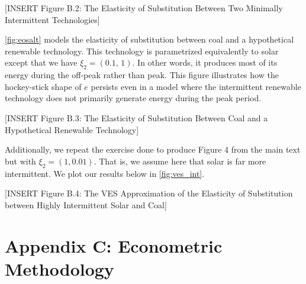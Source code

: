 \documentclass[11pt,a4paper,leqno]{extarticle}
\begin{document}
	
	
	\vspace{0.15in}
	\begin{center}
		[INSERT Figure B.2: The Elasticity of Substitution Between Two  Minimally Intermittent Technologies]
	\end{center}
	\vspace{0.15in}
	
	\autoref{fig:eosalt} models the elasticity of substitution between coal and a hypothetical renewable technology. This technology is parametrized equivalently to solar except that we have $\xi_2 = (0.1, \, 1)$. In other words, it produces most of its energy during the off-peak rather than peak. This figure illustrates how the hockey-stick shape of $e$ persists even in a model where the intermittent renewable technology does not primarily generate energy during the peak period. 
	
	
	\vspace{0.15in}
	\begin{center}
		[INSERT Figure B.3: The Elasticity of Substitution Between Coal  and a Hypothetical Renewable Technology]
	\end{center}
	\vspace{0.15in}
	
	
	Additionally, we repeat the exercise done to produce Figure 4 from the main text but with $\xi_2 = (1, 0.01)$. That is, we assume here that solar is far more intermittent. We plot our results below in 	\autoref{fig:ves_int}. 
	
	
	\vspace{0.15in}
	\begin{center}
		[INSERT Figure B.4: The VES Approximation of the Elasticity of Substitution between Highly Intermittent Solar and Coal]
	\end{center}
	\vspace{0.15in}
	
	
	\pagebreak
	
	\section{Appendix C: Econometric Methodology}
	\label{sec:AppendixC}
	
\end{document}
